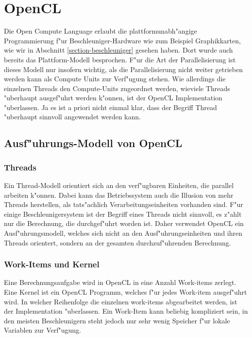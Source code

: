 \section{OpenCL\label{opencl-intro}}
Die Open Compute Language \cite{skript:opencl}
erlaubt die plattformunabh"angige Programmierung
f"ur Beschleuniger-Hardware wie zum Beispiel Graphikkarten, wie wir
in Abschnitt \ref{section-beschleuniger} gesehen haben. 
Dort wurde auch bereits das Plattform-Modell besprochen.
F"ur die Art der Parallelisierung ist dieses Modell nur insofern wichtig,
als die Parallelisierung nicht weiter getrieben werden kann als Compute
Units zur Verf"ugung stehen.
Wie allerdings die einzelnen Threads den Compute-Units zugeordnet werden,
wieviele Threads "uberhaupt ausgef"uhrt werden k"onnen, ist der
OpenCL Implementation "uberlassen.
Ja es ist a priori nicht einmal klar, dass der Begriff Thread "uberhaupt
sinnvoll angewendet werden kann.

\subsection{Ausf"uhrungs-Modell von OpenCL}
\subsubsection{Threads}
Ein Thread-Modell orientiert sich an den verf"ugbaren Einheiten, die
parallel arbeiten k"onnen.
Dabei kann das Betriebssystem auch die Illusion von mehr Threads
herstellen, als tats"achlich Verarbeitungseinheiten vorhanden sind.
F"ur einige Beschleunigersystem ist der Begriff eines Threads nicht
sinnvoll, es z"ahlt nur die Berechnung, die durchgef"uhrt worden ist.
Daher verwendet OpenCL ein Ausf"uhrungsmodell, welches sich nicht
an den Ausf"uhrungseinheiten und ihren Threads orientert, sondern an
der gesamten durchzuf"uhrenden Berechnung.

\subsubsection{Work-Items und Kernel}
Eine Berechnungsaufgabe wird in OpenCL in eine Anzahl Work-items
zerlegt.
Eine Kernel ist ein OpenCL Programm, welches f"ur jedes Work-item
ausgef"uhrt wird.
In welcher Reihenfolge die einzelnen work-items abgearbeitet werden,
ist der Implementation "uberlassen.
Ein Work-Item kann beliebig kompliziert sein, in den meisten Beschleunigern
steht jedoch nur sehr wenig Speicher f"ur lokale Variablen zur Verf"ugung.

